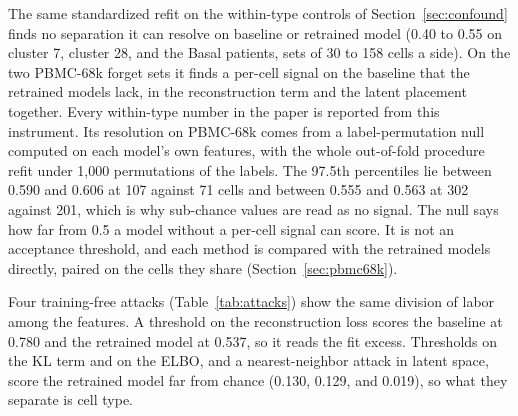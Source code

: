 \documentclass{article}
\begin{document}
The same standardized refit on the within-type controls of Section~\ref{sec:confound} finds no separation it can resolve on baseline or retrained model (0.40 to 0.55 on cluster 7, cluster 28, and the Basal patients, sets of 30 to 158 cells a side). On the two PBMC-68k forget sets it finds a per-cell signal on the baseline that the retrained models lack, in the reconstruction term and the latent placement together. Every within-type number in the paper is reported from this instrument. Its resolution on PBMC-68k comes from a label-permutation null computed on each model's own features, with the whole out-of-fold procedure refit under 1,000 permutations of the labels. The 97.5th percentiles lie between 0.590 and 0.606 at 107 against 71 cells and between 0.555 and 0.563 at 302 against 201, which is why sub-chance values are read as no signal. The null says how far from 0.5 a model without a per-cell signal can score. It is not an acceptance threshold, and each method is compared with the retrained models directly, paired on the cells they share (Section~\ref{sec:pbmc68k}).

Four training-free attacks (Table~\ref{tab:attacks}) show the same division of labor among the features. A threshold on the reconstruction loss scores the baseline at 0.780 and the retrained model at 0.537, so it reads the fit excess. Thresholds on the KL term and on the ELBO, and a nearest-neighbor attack in latent space, score the retrained model far from chance (0.130, 0.129, and 0.019), so what they separate is cell type.

\begin{table}[h]
\centering
\caption{The paper's attacker architecture refit on each model's own raw features, out of fold over 20 random five-fold splits, with the in-sample upper bound. Generated from \texttt{retrain\_refit.json}.}
\label{tab:refit}
\small

\end{table}

\begin{table}[h]
\centering
\caption{Out-of-fold refit AUC (mean $\pm$ standard deviation over fold splits) with a logistic regression on standardized features, the paper's MLP on standardized features, and the paper's MLP on raw features, for PBMC-33k cluster 13 against its cross-type negatives and for every within-type control. Generated from \texttt{within\_type\_standardized\_check.json} and the PBMC-68k result files.}
\label{tab:refit_std}
\small
\resizebox{\textwidth}{!}{}
\end{table}
\end{document}
